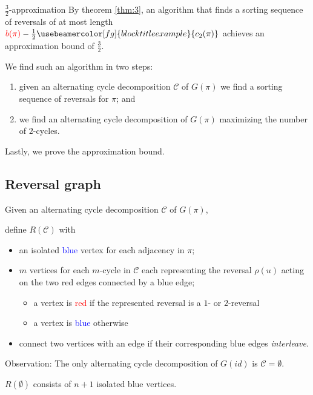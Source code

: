 \documentclass[handout]{beamer}
\theoremstyle{definition}
\def\spadding{\vspace{0.25cm}}
\def\b{\textcolor{blue}}
\def\r{\textcolor{red}}
\def\g#1{{\usebeamercolor[fg]{block title example}{#1}}}
\begin{document}
\begin{frame}

\begin{block}{$\frac{3}{2}$-approximation}
By theorem \ref{thm:3}, an algorithm that finds a sorting sequence of reversals of at most length $\r{b(\pi)} - \frac{1}{2} \g{c_2(\pi)}$ achieves an approximation bound of $\frac{3}{2}$. \pause\spadding

We find such an algorithm in two steps:
\begin{enumerate}
    \item given an alternating cycle decomposition $\mathcal{C}$ of $G(\pi)$ we find a sorting sequence of reversals for $\pi$\pause; and
    \item we find an alternating cycle decomposition of $G(\pi)$ maximizing the number of $2$-cycles.
\end{enumerate}
\end{block}\pause

Lastly, we prove the approximation bound.

\end{frame}

\subsection{Reversal graph}

\begin{frame}

\begin{definition}
Given an alternating cycle decomposition $\mathcal{C}$ of $G(\pi)$, \par\pause
define $R(\mathcal{C})$ with
\begin{itemize}
    \item an isolated \b{blue} vertex for each adjacency in $\pi$\pause;
    \item $m$ vertices for each $m$-cycle in $\mathcal{C}$ each representing the reversal $\rho(u)$ acting on the two red edges connected by a blue edge\pause;
    \begin{itemize}
        \item a vertex is \r{red} if the represented reversal is a $1$- or $2$-reversal
        \item a vertex is \b{blue} otherwise
    \end{itemize}\pause
    \item connect two vertices with an edge if their corresponding blue edges \textit{interleave}.
\end{itemize}
\end{definition}\pause

Observation: The only alternating cycle decomposition of $G(id)$ is $\mathcal{C} = \emptyset$.\pause

\begin{corollary}
$R(\emptyset)$ consists of $n+1$ isolated blue vertices.
\end{corollary}

\end{frame}
\end{document}
